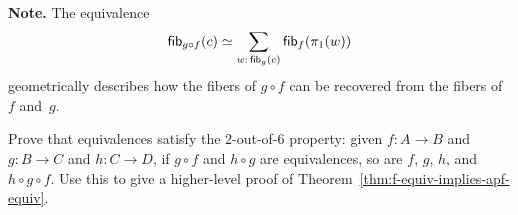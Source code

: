 \begin{solution}
\begin{enumerate}[a),font=\upshape]
        \textbf{Note.} The equivalence
        \[
            \fun{fib}_{g\circ f}(c)\simeq\sum_{w\colon\fun{fib}_g(c)}\fun{fib}_f(\pi_1(w))
        \]
        geometrically describes how the fibers of $g\circ f$ can be recovered from the fibers of~$f$ and~$g$.

    \end{enumerate}
\end{solution}

\begin{exr}\label{exr:f-equiv-implies-apf-equiv}
    Prove that equivalences satisfy the $2$-out-of-$6$ property: given\/ $f\colon A\to B$ and\/ $g\colon B\to C$ and\/ $h\colon C\to D$, if\/ $g\circ f$ and\/ $h\circ g$ are equivalences, so are\/ $f$, $g$, $h$, and\/ $h\circ g\circ f$. Use this to give a higher-level proof of\/ {\upshape Theorem~\ref{thm:f-equiv-implies-apf-equiv}}.
\end{exr}

